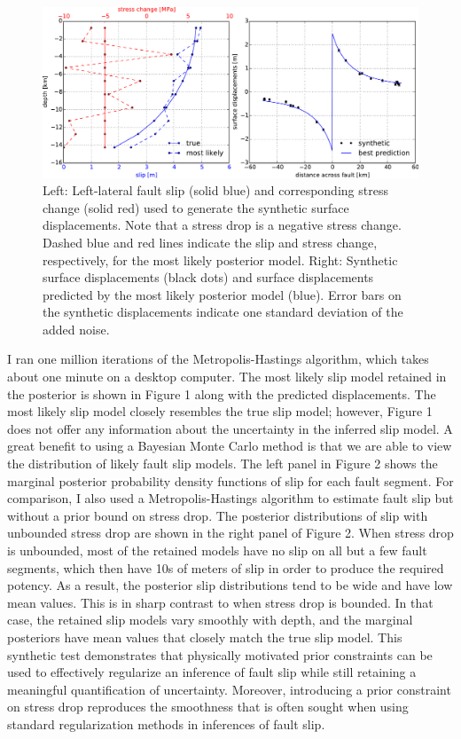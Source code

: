 \documentclass[12pt]{article}
\begin{document}
\begin{figure}
\includegraphics[width=1.0\textwidth]{figure_1}
\caption{Left: Left-lateral fault slip (solid blue) and corresponding stress change (solid red) used to generate the synthetic surface displacements. Note that a stress drop is a negative stress change.  Dashed blue and red lines indicate the slip and stress change, respectively, for the most likely posterior model. Right: Synthetic surface displacements (black dots) and surface displacements predicted by the most likely posterior model (blue).  Error bars on the synthetic displacements indicate one standard deviation of the added noise.}  
\end{figure}

I ran one million iterations of the Metropolis-Hastings algorithm, which takes about one minute on a desktop computer. The most likely slip model retained in the posterior is shown in Figure 1 along with the predicted displacements.  The most likely slip model closely resembles the true slip model; however, Figure 1 does not offer any information about the uncertainty in the inferred slip model. A great benefit to using a Bayesian Monte Carlo method is that we are able to view the distribution of likely fault slip models.  The left panel in Figure 2 shows the marginal posterior probability density functions of slip for each fault segment.  For comparison, I also used a Metropolis-Hastings algorithm to estimate fault slip but without a prior bound on stress drop.  The posterior distributions of slip with unbounded stress drop are shown in the right panel of Figure 2. When stress drop is unbounded, most of the retained models have no slip on all but a few fault segments, which then have 10s of meters of slip in order to produce the required potency.  As a result, the posterior slip distributions tend to be wide and have low mean values.  This is in sharp contrast to when stress drop is bounded.  In that case, the retained slip models vary smoothly with depth, and the marginal posteriors have mean values that closely match the true slip model.  This synthetic test demonstrates that physically motivated prior constraints can be used to effectively regularize an inference of fault slip while still retaining a meaningful quantification of uncertainty.  Moreover, introducing a prior constraint on stress drop reproduces the smoothness that is often sought when using standard regularization methods in inferences of fault slip.
\end{document}
